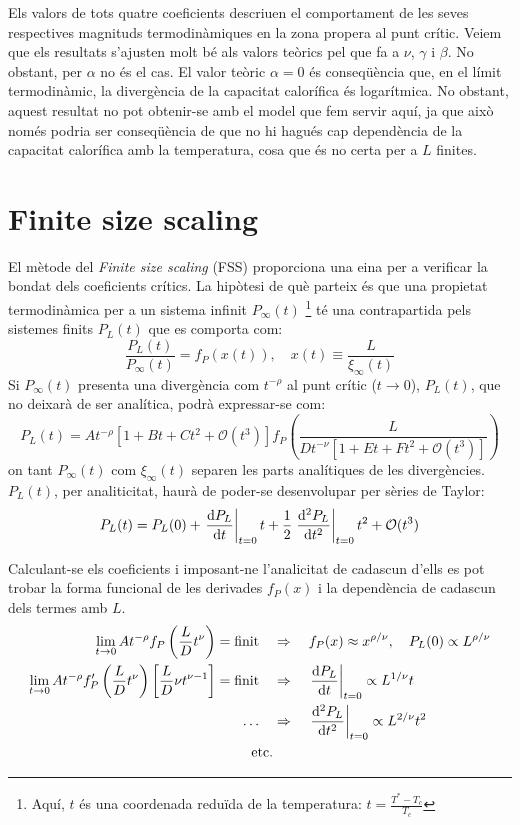 \documentclass[a4paper]{article}
\begin{document}
Els valors de tots quatre coeficients descriuen el comportament de les seves respectives magnituds termodinàmiques en la zona propera al punt crític. Veiem que els resultats s'ajusten molt bé als valors teòrics pel que fa a $\nu$, $\gamma$ i $\beta$. No obstant, per $\alpha$ no és el cas. El valor teòric $\alpha=0$ és conseqüència que, en el límit termodinàmic, la divergència de la capacitat calorífica és logarítmica. No obstant, aquest resultat no pot obtenir-se amb el model que fem servir aquí, ja que això només podria ser conseqüència de que no hi hagués cap dependència de la capacitat calorífica amb la temperatura, cosa que és no certa per a $L$ finites.

\section{Finite size scaling}

El mètode del \textit{Finite size scaling} (FSS) proporciona una eina per a verificar la bondat dels coeficients crítics. La hipòtesi de què parteix és que una propietat termodinàmica per a un sistema infinit $P_\infty (t)$ \footnote{Aquí, $t$ és una coordenada reduïda de la temperatura: $t = \frac{T^* - T_c}{T_c}$} té una contrapartida pels sistemes finits $P_L (t)$ que es comporta com:
\begin{equation*}
    \frac{P_L(t)}{P_\infty (t)} = f_P \left(x(t) \right), \quad x(t) \equiv \frac{L}{\xi_\infty (t)}
\end{equation*}
Si $P_\infty (t)$ presenta una divergència com $t^{-\rho}$ al punt crític ($t \to 0$), $P_L (t)$, que no deixarà de ser analítica, podrà expressar-se com:
\begin{equation*}
    P_L (t) = A t^{-\rho}\left[ 1 + Bt + Ct^2 + \mathcal{O}(t^3) \right] f_P \left( \frac{L}{D t^{-\nu} \left[ 1 + Et + Ft^2 + \mathcal{O}(t^3) \right]} \right)
\end{equation*}
on tant $P_\infty (t)$ com $\xi_\infty (t)$ separen les parts analítiques de les divergències. $P_L (t)$, per analiticitat, haurà de poder-se desenvolupar per sèries de Taylor:
\begin{equation*}
    P_L (t) = P_L (0) + \left.\dv{P_L}{t} \right|_{t=0} t + \frac{1}{2} \left.\dv[2]{P_L}{t} \right|_{t=0} t^2 + \mathcal{O}(t^3)
\end{equation*}

Calculant-se els coeficients i imposant-ne l'analicitat de cadascun d'ells es pot trobar la forma funcional de les derivades $f_P (x)$ i la dependència de cadascun dels termes amb $L$.
\begin{align*}
    \lim_{t \to 0} A t^{-\rho} f_P \left(\frac{L}{D} t^\nu \right) = \text{finit} \quad &\Rightarrow \quad f_P (x) \approx x^{\rho/\nu}, \quad P_L (0) \propto L^{\rho/\nu} \\
    \lim_{t \to 0} A t^{-\rho} f'_P \left(\frac{L}{D} t^\nu \right) \left[\frac{L}{D} \nu t^{\nu -1} \right] = \text{finit} \quad &\Rightarrow \quad \left.\dv{P_L}{t} \right|_{t=0} \propto L^{1/\nu} t \\
    \dots \quad &\Rightarrow \quad \left.\dv[2]{P_L}{t} \right|_{t=0} \propto L^{2/\nu} t^2 \\
    \text{etc.} &\ 
\end{align*}
\end{document}
